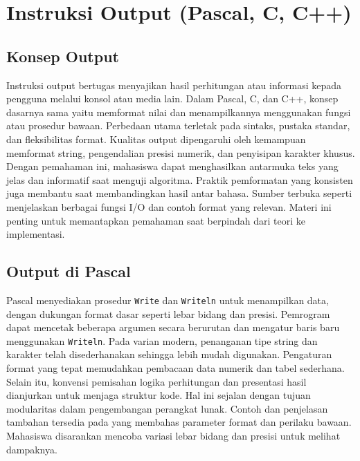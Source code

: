 \documentclass[../main.tex]{subfiles}
\begin{document}
\chapter{Instruksi Output (Pascal, C, C++)}
\section{Konsep Output}
Instruksi output bertugas menyajikan hasil perhitungan atau informasi kepada pengguna melalui konsol atau media lain. Dalam Pascal, C, dan C++, konsep dasarnya sama yaitu memformat nilai dan menampilkannya menggunakan fungsi atau prosedur bawaan. Perbedaan utama terletak pada sintaks, pustaka standar, dan fleksibilitas format.
Kualitas output dipengaruhi oleh kemampuan memformat string, pengendalian presisi numerik, dan penyisipan karakter khusus. Dengan pemahaman ini, mahasiswa dapat menghasilkan antarmuka teks yang jelas dan informatif saat menguji algoritma. Praktik pemformatan yang konsisten juga membantu saat membandingkan hasil antar bahasa.
Sumber terbuka seperti \textcite{w3pascal-io,k&r-c-output-input,cppreference-io} menjelaskan berbagai fungsi I/O dan contoh format yang relevan. Materi ini penting untuk memantapkan pemahaman saat berpindah dari teori ke implementasi.

\section{Output di Pascal}
Pascal menyediakan prosedur \texttt{Write} dan \texttt{Writeln} untuk menampilkan data, dengan dukungan format dasar seperti lebar bidang dan presisi. Pemrogram dapat mencetak beberapa argumen secara berurutan dan mengatur baris baru menggunakan \texttt{Writeln}. Pada varian modern, penanganan tipe string dan karakter telah disederhanakan sehingga lebih mudah digunakan.
Pengaturan format yang tepat memudahkan pembacaan data numerik dan tabel sederhana. Selain itu, konvensi pemisahan logika perhitungan dan presentasi hasil dianjurkan untuk menjaga struktur kode. Hal ini sejalan dengan tujuan modularitas dalam pengembangan perangkat lunak.
Contoh dan penjelasan tambahan tersedia pada \textcite{w3pascal-io,free-pascal-docs} yang membahas parameter format dan perilaku bawaan. Mahasiswa disarankan mencoba variasi lebar bidang dan presisi untuk melihat dampaknya.
\end{document}
